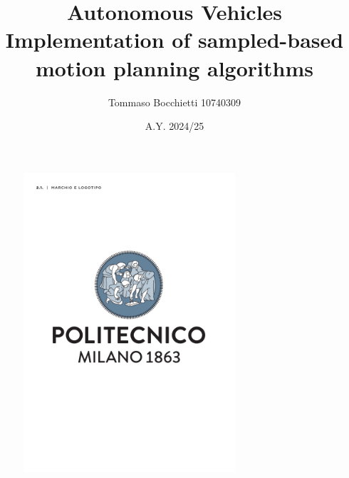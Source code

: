 \documentclass{assignment}
\begin{document}
\title{Autonomous Vehicles \\ Implementation of sampled-based motion planning algorithms}
\author{Tommaso Bocchietti 10740309}
\date{A.Y. 2024/25}

\maketitle

\begin{figure}[H]
    \centering
    \includegraphics[width=0.7\textwidth]{./pdf/Polimi_logo_coverpage.pdf}
    \label{fig:Polimi_logo}
\end{figure}

\clearpage
\tableofcontents
\listoffigures

\clearpage





% 



\vspace*{\fill}
\nocite{*}


\end{document}
